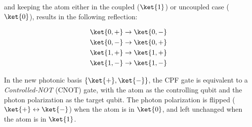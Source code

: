 and keeping the atom either in the coupled ($\ket{1}$) or uncoupled case ($\ket{0}$), results in the following reflection:

\begin{equation}
	\label{eq:reflection_cnot}
	\begin{split}
		\ket{0,+} & \rightarrow \ket{0,-} \\
		\ket{0,-} & \rightarrow \ket{0,+} \\
		\ket{1,+} & \rightarrow \ket{1,+} \\
		\ket{1,-} & \rightarrow \ket{1,-}
	\end{split}
\end{equation}

In the new photonic basis $\left\{\ket{+},\ket{-}\right\}$, the CPF gate is equivalent to a \textit{Controlled-NOT} (CNOT) gate, with the atom as the controlling qubit and the photon polarization as the target qubit. The photon polarization is flipped ($\ket{+}\leftrightarrow\ket{-}$) when the atom is in $\ket{0}$, and left unchanged when the atom is in $\ket{1}$.
